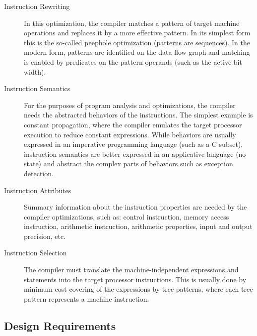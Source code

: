 \documentclass[11pt,a4paper]{article}
\begin{document}
\begin{description}
\item[Instruction Rewriting] In this optimization, the compiler matches a
pattern of target machine operations and replaces it by a more effective
pattern. In its simplest form this is the so-called peephole optimization
(patterns are sequences). In the modern form, patterns are identified on the
data-flow graph and matching is enabled by predicates on the pattern operands
(such as the active bit width).

\item[Instruction Semantics] For the purposes of program analysis and
optimizations, the compiler needs the abstracted behaviors of the instructions.
The simplest example is constant propagation, where the compiler emulates the
target processor execution to reduce constant expressions. While behaviors are
usually expressed in an imperative programming language (such as a C subset),
instruction semantics are better expressed in an applicative language (no state)
and abstract the complex parts of behaviors such as exception detection.

\item[Instruction Attributes] Summary information about the instruction
properties are needed by the compiler optimizations, such as: control
instruction, memory access instruction, arithmetic instruction, arithmetic
properties, input and output precision, etc.

\item[Instruction Selection] The compiler must translate the machine-independent
expressions and statements into the target processor instructions. This is
usually done by minimum-cost covering of the expressions by tree patterns, where
each tree pattern represents a machine instruction.

\end{description}


\subsection{Design Requirements}
\end{document}
